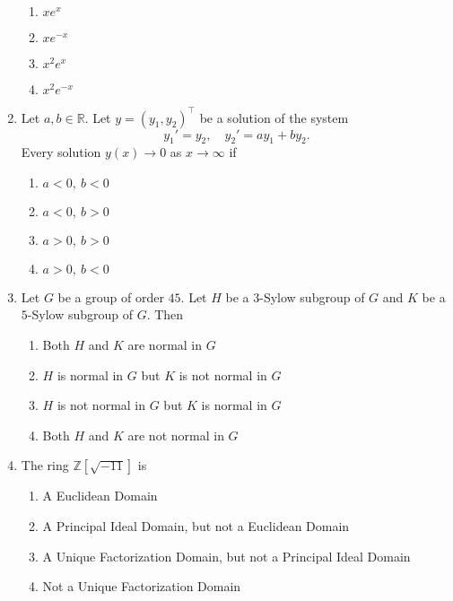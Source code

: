 \documentclass[journal,12pt,onecolumn]{IEEEtran}
\theoremstyle{remark}
\begin{document}
\begin{enumerate}
\begin{enumerate}[label=(\Alph*)]
\item $x e^x$
\item $x e^{-x}$
\item $x^2 e^x$
\item $x^2 e^{-x}$
\end{enumerate}

\item Let $a,b \in \mathbb{R}$. Let $y = (y_1, y_2)^\top$ be a solution of the system
\[
y_1' = y_2, \quad y_2' = a y_1 + b y_2.
\]
Every solution $y(x) \to 0$ as $x \to \infty$ if
\\[-0.3em]\makebox[\textwidth][r]{\textit{[GATE EE 2025]}}

\begin{enumerate}[label=(\Alph*)]
\item $a < 0, \ b < 0$
\item $a < 0, \ b > 0$
\item $a > 0, \ b > 0$
\item $a > 0, \ b < 0$
\end{enumerate}

\item Let $G$ be a group of order $45$. Let $H$ be a $3$-Sylow subgroup of $G$ and $K$ be a $5$-Sylow subgroup of $G$. Then
\\[-0.3em]\makebox[\textwidth][r]{\textit{[GATE EE 2025]}}

\begin{enumerate}[label=(\Alph*)]
\item Both $H$ and $K$ are normal in $G$
\item $H$ is normal in $G$ but $K$ is not normal in $G$
\item $H$ is not normal in $G$ but $K$ is normal in $G$
\item Both $H$ and $K$ are not normal in $G$
\end{enumerate}

\item The ring $\mathbb{Z}[\sqrt{-11}]$ is
\\[-0.3em]\makebox[\textwidth][r]{\textit{[GATE EE 2025]}}

\begin{enumerate}[label=(\Alph*)]
\item A Euclidean Domain
\item A Principal Ideal Domain, but not a Euclidean Domain
\item A Unique Factorization Domain, but not a Principal Ideal Domain
\item Not a Unique Factorization Domain
\end{enumerate}


\end{enumerate}
\end{document}
